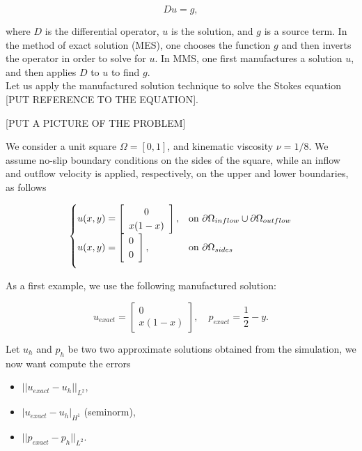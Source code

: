 \documentclass[11pt,a4paper,titlepage]{report}
\begin{document}
\[
Du = g,
\]

where $D$ is the differential operator, $u$ is the solution, and $g$ is a source term. In the method of exact solution (MES), one chooses the function $g$ and then inverts the operator in order to solve for $u$. In MMS, one first manufactures a solution $u$, and then applies $D$ to $u$ to find $g$. \\

Let us apply the manufactured solution technique to solve the Stokes equation [PUT REFERENCE TO THE EQUATION]. 

[PUT A PICTURE OF THE PROBLEM]

We consider a unit square $\Omega = [0,1]$, and kinematic viscosity $\nu = 1/8$. We assume no-slip boundary conditions on the sides of the square, while an inflow and outflow velocity is applied, respectively, on the upper and lower boundaries, as follows

\[
\begin{cases}
u(x,y) = \left[ \begin{array}{c} 0 \\ x(1-x) \end{array} \right] , & \mbox{on } \partial \Omega_{inflow} \cup \partial \Omega_{outflow} \\

\vspace{.2cm}

u(x,y) = \left[ \begin{array}{c} 0 \\ 0 \end{array} \right], & \mbox{on } \partial \Omega_{sides}
\end{cases}
\]

As a first example, we use the following manufactured solution:

\[
u_{exact} = \left[ \begin{array}{c} 0 \\ x(1-x) \end{array} \right], \quad 
p_{exact} = \frac{1}{2}-y.
\]

Let $u_h$ and $p_h$ be two two approximate solutions obtained from the simulation, we now want compute the errors

\begin{itemize}
\item $|| u_{exact} - u_h ||_{L^2}$,
\item $ | u_{exact} - u_h |_{H^1}$ (seminorm),
\item $|| p_{exact} - p_h ||_{L^2} $.
\end{itemize}
\end{document}
